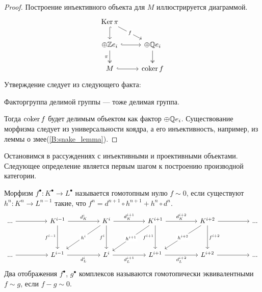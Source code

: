 \documentclass[../main.tex]{subfiles}
\begin{document}
\begin{proof}
    Построение инъективного объекта для $M$ иллюстрируется диаграммой.
    \begin{equation}
        \begin{tikzcd}
	{\Ker \pi} \\
	{\oplus \Z e_i} & {\oplus \Q e_i} \\
	M & {\coker f}
	\arrow[hook, from=2-1, to=2-2]
	\arrow["\pi"', two heads, from=2-1, to=3-1]
	\arrow[hook, from=1-1, to=2-1]
	\arrow["f"{description}, from=1-1, to=2-2]
	\arrow[two heads, from=2-2, to=3-2]
	\arrow[hook, from=3-1, to=3-2]
\end{tikzcd}
    \end{equation}
    Утверждение следует из следующего факта:
    \begin{to_suj}
    Факторгруппа делимой группы --- тоже делимая группа.
    \end{to_suj}
    Тогда $\operatorname{coker} f$ будет делимым объектом как фактор $\oplus \mathbb{Q} e_i$. Существование морфизма следует из универсальности коядра, а его инъективность, например, из леммы о змее(\ref{B:snake_lemma}).
\end{proof}
Остановимся в рассуждениях с инъективными и проективными объектами. Следующее определение является первым шагом к построению производной категории.
\begin{to_def}
Морфизм $f^\bullet:K^\bullet \to L^\bullet$ называется гомотопным нулю $f\sim 0$, если существуют $h^n:K^n\to L^{n-1}$ такие, что $f^n = d^{n+1}\circ h^{n+1} + h^{n}\circ d^{n}$.
\begin{equation*}
    \begin{tikzcd}[sep=huge]
	{...} & {K^{i-1}} & {K^i} & {K^{i+1}} & {K^{i+2}} & {...} \\
	{...} & {L^{i-1}} & {L^i} & {L^{i+1}} & {L^{i+2}} & {...}
	\arrow[from=1-1, to=1-2]
	\arrow["{d_K^i}", from=1-2, to=1-3]
	\arrow["{d_K^{i+1}}", from=1-3, to=1-4]
	\arrow[from=1-5, to=1-6]
	\arrow[from=2-1, to=2-2]
	\arrow["{d_L^i}"', from=2-2, to=2-3]
	\arrow["{d_L^{i+1}}"', from=2-3, to=2-4]
	\arrow["{d_L^{i+2}}"', from=2-4, to=2-5]
	\arrow[from=2-5, to=2-6]
	\arrow["{f^{i-1}}"', from=1-2, to=2-2]
	\arrow["{f^i}"', from=1-3, to=2-3]
	\arrow["{f^{i+1}}"', from=1-4, to=2-4]
	\arrow["{f^{i+2}}", from=1-5, to=2-5]
	\arrow["{d_K^{i+2}}", from=1-4, to=1-5]
	\arrow["{h^i}"{description}, from=1-3, to=2-2]
	\arrow["{h^{i+1}}"{description}, from=1-4, to=2-3]
	\arrow["{h^{i+2}}"{description}, from=1-5, to=2-4]
\end{tikzcd}
\end{equation*}
Два отображения $f^\bullet$, $g^\bullet$ комплексов называются гомотопически эквивалентными $f\sim g$, если $f-g \sim 0$.
\end{to_def}
\end{document}
